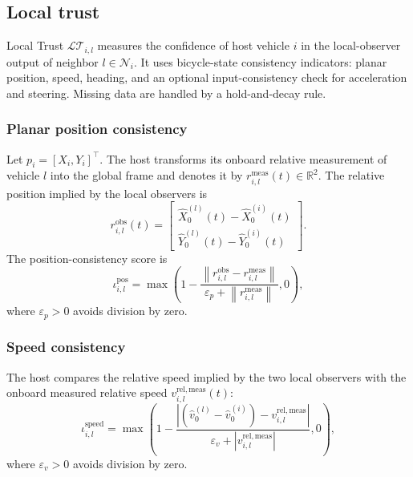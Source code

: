 \documentclass[letterpaper,journal]{IEEEtran}
\def\N{\mathcal{N}} %
\def\LT{\mathcal{LT}} %
\begin{document}
\subsection{Local trust}\label{sub:local_trust}

Local Trust $\LT_{i,l}$ measures the confidence of host vehicle $i$ in the local-observer output of neighbor $l \in \N_i$.
It uses bicycle-state consistency indicators: planar position, speed, heading, and an optional input-consistency check for acceleration and steering. Missing data are handled by a hold-and-decay rule.

\subsubsection{Planar position consistency}
Let $p_i=[X_i,Y_i]^\top$. The host transforms its onboard relative measurement of vehicle $l$ into the global frame and denotes it by $r_{i,l}^{\mathrm{meas}}(t)\in\mathbb{R}^2$. The relative position implied by the local observers is
\begin{equation*}
    r_{i,l}^{\mathrm{obs}}(t)=
    \begin{bmatrix}\hat X_0^{(l)}(t)-\hat X_0^{(i)}(t)\\
    \hat Y_0^{(l)}(t)-\hat Y_0^{(i)}(t)
    \end{bmatrix}.
\end{equation*}
The position-consistency score is
\begin{equation*}
    \iota_{i,l}^{\text{pos}}
    =
    \max\left(
    1 -
    \frac{\left\|r_{i,l}^{\mathrm{obs}}-r_{i,l}^{\mathrm{meas}}\right\|}
    {\varepsilon_p+\left\|r_{i,l}^{\mathrm{meas}}\right\|},
    0
    \right),
\end{equation*}
where $\varepsilon_p>0$ avoids division by zero.

\subsubsection{Speed consistency}
The host compares the relative speed implied by the two local observers with the onboard measured relative speed $v_{i,l}^{\mathrm{rel,meas}}(t)$:
\begin{equation*}
    \iota_{i,l}^{\text{speed}}
    =
    \max\left(
    1 -
    \frac{\left|(\hat{v}_{0}^{(l)}-\hat{v}_{0}^{(i)})-v_{i,l}^{\mathrm{rel,meas}}\right|}
    {\varepsilon_v+\left|v_{i,l}^{\mathrm{rel,meas}}\right|},
    0
    \right),
\end{equation*}
where $\varepsilon_v>0$ avoids division by zero.
\end{document}
